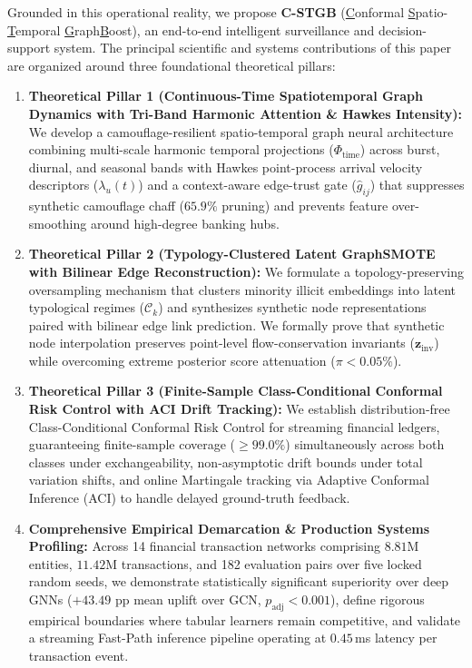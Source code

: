 Grounded in this operational reality, we propose \textbf{C-STGB} (\underline{C}onformal \underline{S}patio-\underline{T}emporal \underline{G}raph\underline{B}oost), an end-to-end intelligent surveillance and decision-support system. The principal scientific and systems contributions of this paper are organized around three foundational theoretical pillars:
\begin{enumerate}
    \item \textbf{Theoretical Pillar 1 (Continuous-Time Spatiotemporal Graph Dynamics with Tri-Band Harmonic Attention \& Hawkes Intensity):} We develop a camouflage-resilient spatio-temporal graph neural architecture combining multi-scale harmonic temporal projections ($\Phi_{\text{time}}$) across burst, diurnal, and seasonal bands with Hawkes point-process arrival velocity descriptors ($\lambda_u(t)$) and a context-aware edge-trust gate ($\hat{g}_{ij}$) that suppresses synthetic camouflage chaff ($65.9\%$ pruning) and prevents feature over-smoothing around high-degree banking hubs.
    \item \textbf{Theoretical Pillar 2 (Typology-Clustered Latent GraphSMOTE with Bilinear Edge Reconstruction):} We formulate a topology-preserving oversampling mechanism that clusters minority illicit embeddings into latent typological regimes ($\mathcal{C}_k$) and synthesizes synthetic node representations paired with bilinear edge link prediction. We formally prove that synthetic node interpolation preserves point-level flow-conservation invariants ($\mathbf{z}_{\text{inv}}$) while overcoming extreme posterior score attenuation ($\pi < 0.05\%$).
    \item \textbf{Theoretical Pillar 3 (Finite-Sample Class-Conditional Conformal Risk Control with ACI Drift Tracking):} We establish distribution-free Class-Conditional Conformal Risk Control for streaming financial ledgers, guaranteeing finite-sample coverage ($\ge 99.0\%$) simultaneously across both classes under exchangeability, non-asymptotic drift bounds under total variation shifts, and online Martingale tracking via Adaptive Conformal Inference (ACI) to handle delayed ground-truth feedback.
    \item \textbf{Comprehensive Empirical Demarcation \& Production Systems Profiling:} Across 14 financial transaction networks comprising $8.81\text{M}$ entities, $11.42\text{M}$ transactions, and 182 evaluation pairs over five locked random seeds, we demonstrate statistically significant superiority over deep GNNs ($+43.49\text{ pp}$ mean uplift over GCN, $p_{\text{adj}} < 0.001$), define rigorous empirical boundaries where tabular learners remain competitive, and validate a streaming Fast-Path inference pipeline operating at $0.45$\,ms latency per transaction event.
\end{enumerate}

